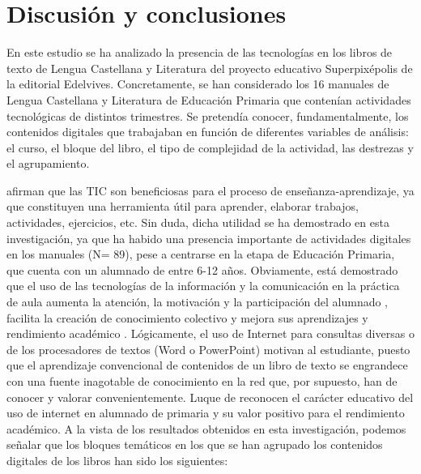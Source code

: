 \documentclass{textolivre}
\begin{document}
\section{Discusión y conclusiones}\label{sec-conclusao}
En este estudio se ha analizado la presencia de las tecnologías en los libros de texto de Lengua Castellana y Literatura del proyecto educativo Superpixépolis de la editorial Edelvives. Concretamente, se han considerado los 16 manuales de Lengua Castellana y Literatura de Educación Primaria que contenían actividades tecnológicas de distintos trimestres. Se pretendía conocer, fundamentalmente, los contenidos digitales que trabajaban en función de diferentes variables de análisis: el curso, el bloque del libro, el tipo de complejidad de la actividad, las destrezas y el agrupamiento. 

\textcite{marin_diaz_universidad_2012} afirman que las TIC son beneficiosas para el proceso de enseñanza-aprendizaje, ya que constituyen una herramienta útil para aprender, elaborar trabajos, actividades, ejercicios, etc. Sin duda, dicha utilidad se ha demostrado en esta investigación, ya que ha habido una presencia importante de actividades digitales en los manuales (N= 89), pese a centrarse en la etapa de Educación Primaria, que cuenta con un alumnado de entre 6-12 años. Obviamente, está demostrado que el uso de las tecnologías de la información y la comunicación en la práctica de aula aumenta la atención, la motivación y la participación del alumnado \cite{domingo-coscollola_classroom_2011}, facilita la creación de conocimiento colectivo \cite{gairin_sallan_2010} y mejora sus aprendizajes y rendimiento académico \cite{prats_i_fernandez_pueden_2015}. Lógicamente, el uso de Internet para consultas diversas o de los procesadores de textos (Word o PowerPoint) motivan al estudiante, puesto que el aprendizaje convencional de contenidos de un libro de texto se engrandece con una fuente inagotable de conocimiento en la red que, por supuesto, han de conocer y valorar convenientemente. Luque de \textcite{luque_de_la_rosa_tecnologias_2015} reconocen el carácter educativo del uso de internet en alumnado de primaria y su valor positivo para el rendimiento académico. 
A la vista de los resultados obtenidos en esta investigación, podemos señalar que los bloques temáticos en los que se han agrupado los contenidos digitales de los libros han sido los siguientes: 
\end{document}
